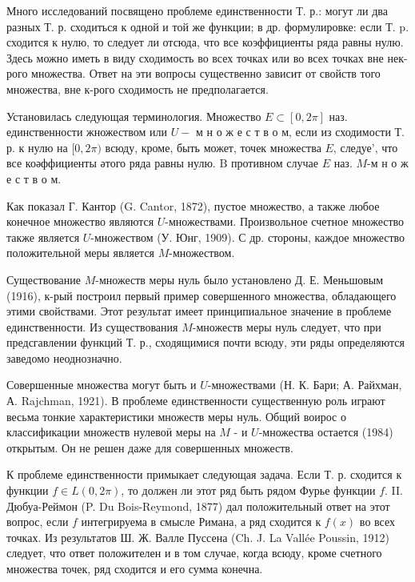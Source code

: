 \documentclass[10pt]{article}
\begin{document}
Много исследований посвящено проблеме единственности Т. р.: могут ли два разных Т. р. сходиться к одной и той же функции; в др. формулировке: если Т. p. сходится к нулю, то следует ли отсюда, что все коэффициенты ряда равны нулю. Здесь можно иметь в виду сходимость во всех точках или во всех точках вне нек-рого множества. Ответ на эти вопросы существенно зависит от свойств того множества, вне к-рого сходимость не предполагается.



Установилась следующая терминология. Множество $E \subset[0,2 \pi]$ наз. единственности жножеством или $U-$ м н о ж е с т в о м, если из сходимости Т. р. к нулю на $[0,2 \pi)$ всюду, кроме, быть может, точек множества $E$, следуе', что все коәффициенты әтого ряда равны нулю. $\mathrm{B}$ противном случае $E$ наз. $M$-м н о ж е с т в о м.



Как показал Г. Кантор (G. Cantor, 1872), пустое множество, а также любое конечное множество являются $U$-множествами. Произвольное счетное множество также является $U$-множеством (У. Юнг, 1909). С др. стороны, каждое множество положительной меры является $M$-множеством.



Существование $M$-множеств меры нуль было установлено Д. Е. Меньшовым (1916), к-рый построил первый пример совершенного множества, обладающего этими свойствами. Этот результат имеет принципиальное значение в проблеме единственности. Из существования $M$-множеств меры нуль следует, что при предсгавлении функций Т. р., сходящимися почти всюду, эти ряды определяются заведомо неоднозначно.



Совершенные множества могут быть и $U$-множествами (Н. К. Бари; А. Райхман, А. Rajchman, 1921). В проблеме единственности существенную роль играют весьма тонкие характеристики множеств меры нуль. Общий воирос о классификации множеств нулевоӥ меры на $M$ - и $U$-множества остается (1984) открытым. Он не решен даже для совершенных множеств.



К проблеме единственности примыкает следующая задача. Если Т. р. сходится к функции $f \in L(0,2 \pi)$, то должен ли этот ряд быть рядом Фурье функции $f$. II. Дюбуа-Реймон (P. Du Bois-Reymond, 1877) дал положительный ответ на этот вопрос, если $f$ интегрируема в смысле Римана, а ряд сходится к $f(x)$ во всех точках. Из результатов Ш. Ж. Валле Пуссена (Ch. J. La Vallée Poussin, 1912) следует, что ответ положителен и в том случае, когда всюду, кроме счетного множества точек, ряд сходится и его сумма конечна.
\end{document}
